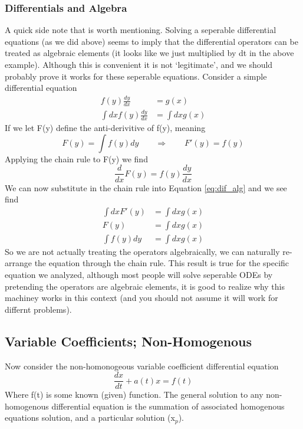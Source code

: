 \documentclass{article}
\newcommand{\be}{\begin{equation}}
\newcommand{\ee}{\end{equation}}
\begin{document}
\subsubsection*{Differentials and Algebra}
A quick side note that is worth mentioning.
Solving a seperable differential equations (as we did above) seems to imply that the differential operators can be treated as algebraic elements (it looks like we just multiplied by dt in the above example).
Although this is convenient it is not `legitimate', and we should probably prove it works for these seperable equations.
Consider a simple differential equation
\be \label{eq:dif_alg}
\begin{split}
    f(y) \frac{dy}{dx} &= g(x)\\
    \int dx f(y) \frac{dy}{dx} &= \int dx g(x)
\end{split}
\ee
If we let F(y) define the anti-derivitive of f(y), meaning
\be
F(y) = \int f(y) dy \qquad \Rightarrow \qquad F'(y) = f(y)
\ee
Applying the chain rule to F(y) we find
\be
\frac{d}{dx} F(y) = f(y) \frac{dy}{dx}
\ee
We can now substitute in the chain rule into Equation \ref{eq:dif_alg} and we see find
\be
\begin{split}
    \int dx F'(y) &= \int dx g(x)\\
    F(y) &= \int dx g(x) \\
    \int f(y) dy &= \int dx g(x)
\end{split}
\ee
So we are not actually treating the operators algebraically, we can naturally re-arrange the equation through the chain rule.
This result is true for the specific equation we analyzed, although most people will solve seperable ODEs by pretending the operators are algebraic elements, it is good to realize why this machiney works in this context (and you should not assume it will work for differnt problems). 

\subsection*{Variable Coefficients; Non-Homogenous}
Now consider the non-homonogeous variable coefficient differential equation
\be \label{eq:vc_non}
\frac{dx}{dt} + a(t) x = f(t)
\ee
Where f(t) is some known (given) function.
The general solution to any non-homogenous differential equation is the summation of associated homogenous equations solution, and a particular solution (x$_p$).
\end{document}
